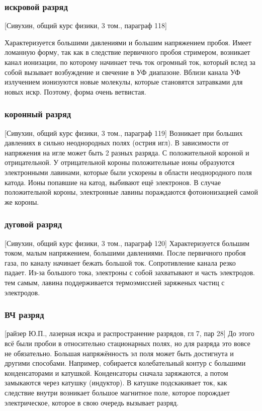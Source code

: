 \documentclass[10pt, a4paper]{article}
\begin{document}
\subsubsection{искровой разряд}
[Сивухин, общий курс физики, 3 том., параграф 118]

Характеризуется большими давлениями и большим напряжением пробоя.
Имеет ломанную форму, так как в следствие первичного пробоя стримером, возникает канал ионизации, по которому начинает течь ток огромный ток, который вслед за собой вызывает возбуждение и свечение в УФ диапазоне. Вблизи канала УФ излучением ионизуются новые молекулы, которые становятся затравками для новых искр. Поэтому, форма очень ветвистая.

\subsubsection{коронный разряд}
[Сивухин, общий курс физики, 3 том., параграф 119]
Возникает при больших давлениях в сильно неоднородных полях (острия игл). В зависимости от напряжения на игле может быть 2 разных разряда. С положительной короной и отрицательной.
У отрицательной короны положительные ионы образуются электронными лавинами, которые были ускорены в области неоднородного поля катода. Ионы попавшие на катод, выбивают ещё электронов.
В случае положительной короны,  электронные лавины пораждаются фотоионизацией самой же короны.

\subsubsection{дуговой разряд}
[Сивухин, общий курс физики, 3 том., параграф 120]
Характеризуется большим током, малым напряжением, большими давлениями.
После первичного пробоя газа, по каналу начинает бежать большой ток. Сопротивление канала резко падает. Из-за большого тока, электроны с собой захватывают и часть электродов. тем самым, лавина поддерживается термоэмиссией заряженых частиц с электродов.

\subsubsection{ВЧ разряд}
[райзер Ю.П., лазерная искра и распространение разрядов, гл 7, пар 28]
До этого всё были пробои в относительно стационарных полях, но для разряда это вовсе не обязательно. Большая напряжённость эл поля может быть достигнута и другими способами. Например, собирается колебательный контур с большими конденсаторами и катушкой. Конденсаторы сначала заряжаются, а потом замыкаются через катушку (индуктор). В катушке подскакивает ток, как следствие внутри возникает большое магнитное поле, которое порождает электрическое, которое в свою очередь вызывает разряд.
\end{document}
